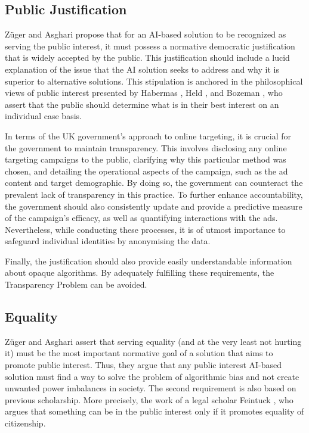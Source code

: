 \documentclass[preprint]{acmart}
\begin{document}
\subsection{Public Justification}


Züger and Asghari \cite{zuger2022} propose that for an AI-based solution to be recognized as serving the public interest, it must possess a normative democratic justification that is widely accepted by the public. This justification should include a lucid explanation of the issue that the AI solution seeks to address and why it is superior to alternative solutions. This stipulation is anchored in the philosophical views of public interest presented by Habermas \cite{habermas2022neuer}, Held \cite{held1970}, and Bozeman \cite{bozeman2007}, who assert that the public should determine what is in their best interest on an individual case basis.

In terms of the UK government's approach to online targeting, it is crucial for the government to maintain transparency. This involves disclosing any online targeting campaigns to the public, clarifying why this particular method was chosen, and detailing the operational aspects of the campaign, such as the ad content and target demographic. By doing so, the government can counteract the prevalent lack of transparency in this practice. To further enhance accountability, the government should also consistently update and provide a predictive measure of the campaign's efficacy, as well as quantifying interactions with the ads. Nevertheless, while conducting these processes, it is of utmost importance to safeguard individual identities by anonymising the data.



Finally, the justification should also provide easily understandable information about opaque algorithms. By adequately fulfilling these requirements, the Transparency Problem can be avoided.


\subsection{Equality}

Züger and Asghari \cite{zuger2022} assert that serving equality (and at the very least not hurting it) must be the most important normative goal of a solution that aims to promote public interest. Thus, they argue that any public interest AI-based solution must find a way to solve the problem of algorithmic bias and not create unwanted power imbalances in society. The second requirement is also based on previous scholarship. More precisely, the work of a legal scholar Feintuck \cite{feintuck2004}, who argues that something can be in the public interest only if it promotes equality of citizenship. 
\end{document}
